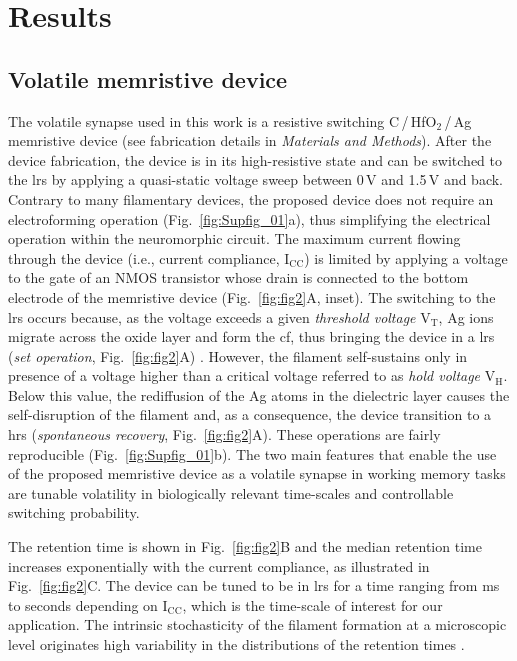 \section{Results}
\subsection{Volatile memristive device}

The volatile synapse used in this work is a resistive switching C\,/\,HfO$\mathrm{_2}$\,/\,Ag memristive device (see fabrication details in \textit{Materials and Methods}). After the device fabrication, the device is in its high-resistive state and can be switched to the \gls{lrs} by applying a quasi-static voltage sweep between 0\,V and 1.5\,V and back. Contrary to many filamentary devices, the proposed device does not require an electroforming operation (Fig.~\ref{fig:Supfig_01}a), thus simplifying the electrical operation within the neuromorphic circuit. The maximum current flowing through the device (i.e., current compliance, I$\mathrm{_{CC}}$) is limited by applying a voltage to the gate of an NMOS transistor whose drain is connected to the bottom electrode of the memristive device (Fig.~\ref{fig:fig2}A, inset). The switching to the \gls{lrs} occurs because, as the voltage exceeds a given \textit{threshold voltage} V$\mathrm{_{T}}$, Ag ions migrate across the oxide layer and form the \gls{cf}, thus bringing the device in a \gls{lrs} (\textit{set operation}, Fig.~\ref{fig:fig2}A) \cite{Wang2016, Li2020, wang2019TED-II}. However, the filament self-sustains only in presence of a voltage higher than a critical voltage referred to as \textit{hold voltage} V$\mathrm{_{H}}$. Below this value, the rediffusion of the Ag atoms in the dielectric layer causes the self-disruption of the filament and, as a consequence, the device transition to a \gls{hrs} (\textit{spontaneous recovery}, Fig.~\ref{fig:fig2}A). These operations are fairly reproducible (Fig.~\ref{fig:Supfig_01}b). The two main features that enable the use of the proposed memristive device as a volatile synapse in working memory tasks are tunable volatility in biologically relevant time-scales and controllable switching probability.

The retention time is shown in Fig.~\ref{fig:fig2}B and the median retention time increases exponentially with the current compliance, as illustrated in Fig.~\ref{fig:fig2}C. The device can be tuned to be in \gls{lrs} for a time ranging from ms to seconds depending on I$\mathrm{_{CC}}$, which is the time-scale of interest for our application. The intrinsic stochasticity of the filament formation at a microscopic level originates high variability in the distributions of the retention times \cite{Chekol2021}.

